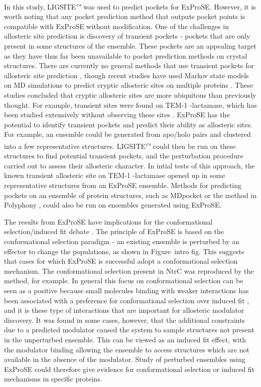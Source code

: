 In this study, LIGSITE\textsuperscript{\it cs} was used to predict pockets for ExProSE.
However, it is worth noting that any pocket prediction method that outputs pocket points is compatible with ExProSE without modification.
One of the challenges in allosteric site prediction is discovery of transient pockets - pockets that are only present in some structures of the ensemble.
These pockets are an appealing target as they have thus far been unavailable to pocket prediction methods on crystal structures.
There are currently no general methods that use transient pockets for allosteric site prediction \cite{Boehr2009}, though recent studies have used Markov state models on MD simulations to predict cryptic allosteric sites on multiple proteins \cite{Bowman2012, Bowman2015}.
These studies concluded that cryptic allosteric sites are more ubiquitous than previously thought.
For example, transient sites were found on TEM-1 \textbeta -lactamase, which has been studied extensively without observing these sites \cite{Bowman2015}.
ExProSE has the potential to identify transient pockets and predict their ability as allosteric sites.
For example, an ensemble could be generated from apo/holo pairs and clustered into a few representative structures.
LIGSITE\textsuperscript{\it cs} could then be run on these structures to find potential transient pockets, and the perturbation procedure carried out to assess their allosteric character.
In intial tests of this approach, the known transient allosteric site on TEM-1 \textbeta -lactamase opened up in some representative structures from an ExProSE ensemble.
Methods for predicting pockets on an ensemble of protein structures, such as MDpocket \cite{Schmidtke2011} or the method in Polyphony \cite{Pitt2014}, could also be run on ensembles generated using ExProSE.

The results from ExProSE have implications for the conformational selection/induced fit debate \cite{Boehr2009}.
The principle of ExProSE is based on the conformational selection paradigm - an existing ensemble is perturbed by an effector to change the populations, as shown in Figure~intro fig.
This suggests that cases for which ExProSE is successful adopt a conformational selection mechanism.
The conformational selection present in NtrC was reproduced by the method, for example.
In general this focus on conformational selection can be seen as a positive because small molecules binding with weaker interactions has been associated with a preference for conformational selection over induced fit \cite{Okazaki2008}, and it is these type of interactions that are important for allosteric modulator discovery.
It was found in some cases, however, that the additional constraints due to a predicted modulator caused the system to sample structures not present in the unperturbed ensemble.
This can be viewed as an induced fit effect, with the modulator binding allowing the ensemble to access structures which are not available in the absence of the modulator.
Study of perturbed ensembles using ExProSE could therefore give evidence for conformational selection or induced fit mechanisms in specific proteins.

